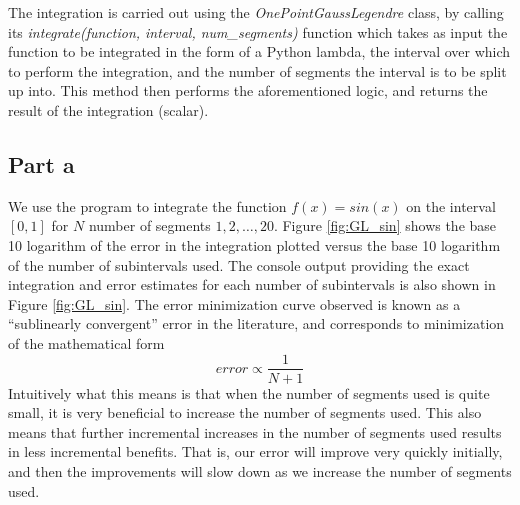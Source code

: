 \documentclass[11pt]{article}
\begin{document}
The integration is carried out using the \textit{OnePointGaussLegendre} class, by calling its \textit{integrate(function, interval, num\_segments)} function which takes as input the function to be integrated in the form of a Python lambda, the interval over which to perform the integration, and the number of segments the interval is to be split up into. This method then performs the aforementioned logic, and returns the result of the integration (scalar).

\subsection*{Part a}
We use the program to integrate the function $f(x) = sin(x)$ on the interval $[0, 1]$ for $N$ number of segments $1, 2, \ldots , 20$. Figure \ref{fig:GL_sin} shows the base 10 logarithm of the error in the integration plotted versus the base 10 logarithm of the number of subintervals used. The console output providing the exact integration and error estimates for each number of subintervals is also shown in Figure \ref{fig:GL_sin}. The error minimization curve observed is known as a ``sublinearly convergent'' error in the literature, and corresponds to minimization of the mathematical form
$$ error \propto \frac{1}{N + 1} $$
Intuitively what this means is that when the number of segments used is quite small, it is very beneficial to increase the number of segments used. This also means that further incremental increases in the number of segments used results in less incremental benefits. That is, our error will improve very quickly initially, and then the improvements will slow down as we increase the number of segments used.
\end{document}
